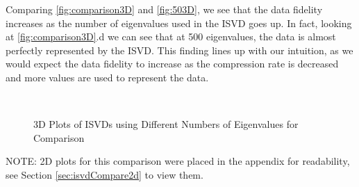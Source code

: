 Comparing \autoref{fig:comparison3D} and \autoref{fig:503D}, we see that the data fidelity increases as the number of eigenvalues used in the ISVD goes up. In fact, looking at \autoref{fig:comparison3D}.d we can see that at 500 eigenvalues, the data is almost perfectly represented by the ISVD. This finding lines up with our intuition, as we would expect the data fidelity to increase as the compression rate
is decreased and more values are used to represent the data. 
\begin{figure}[H]
    \centering
    \qquad
     \\
    \qquad
    \caption{3D Plots of ISVDs using Different Numbers of Eigenvalues for Comparison}%
    \label{fig:comparison3D}%
\end{figure}

\noindent
NOTE: 2D plots for this comparison were placed in the appendix for readability, see Section \ref{sec:isvdCompare2d} to view them.
